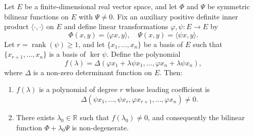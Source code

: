 Let $E$ be a finite-dimensional real vector space, and let $\Phi$ and $\Psi$ be symmetric bilinear functions on $E$ with $\Psi \neq 0$. Fix an auxiliary positive definite inner product $\langle\cdot,\cdot\rangle$ on $E$ and define linear transformations $\varphi, \psi: E \to E$ by
$$\Phi(x, y) = \langle \varphi x, y \rangle, \quad \Psi(x, y) = \langle \psi x, y \rangle.$$
Let $r = \operatorname{rank}(\psi) \geq 1$, and let $\{x_1, \ldots, x_n\}$ be a basis of $E$ such that $\{x_{r+1}, \ldots, x_n\}$ is a basis of $\ker \psi$. Define the polynomial
$$f(\lambda) = \Delta(\varphi x_1 + \lambda \psi x_1, \ldots, \varphi x_n + \lambda \psi x_n),$$
where $\Delta$ is a non-zero determinant function on $E$. Then:
\begin{enumerate}
\item $f(\lambda)$ is a polynomial of degree $r$ whose leading coefficient is
$$\Delta(\psi x_1, \ldots, \psi x_r, \varphi x_{r+1}, \ldots, \varphi x_n) \neq 0.$$
\item There exists $\lambda_0 \in \mathbb{R}$ such that $f(\lambda_0) \neq 0$, and consequently the bilinear function $\Phi + \lambda_0 \Psi$ is non-degenerate.
\end{enumerate}
